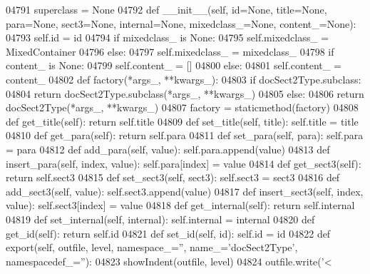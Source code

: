 \begin{DoxyCode}
{{{{{{{{{{{{{{{{{{{{{{{{{{{{{{{{{{{{{{{{{{{{{{{{{{{{{{{{{{{{{{{{{{{{{{{{{{{{{{{{{{{{{{{{{{{{{{{{{{{{{{{{{{{{{{{{{{{{{{{{{{{{{{{{{{{{{{{{{{{{{{{{{{{{{{{{{{{{{{{{{{{{{{{{{{{{{{{{{{{{{{{{{{{{{{{{{{{{{{{{{{{{{{{{{{{{{{{{{{{{{{{{{{{{{{{{{{{{{{{{{{{{{{{{{{{{{{{{{{{{{{{{{{{{{{{{{{{{{{{{{{{{{{{{{{{{{{{{{{{{{{{{{{{{{{{{{{{{{{{{{{{{04791     superclass = \textcolor{keywordtype}{None}
04792     \textcolor{keyword}{def }__init__(self, id=None, title=None, para=None, sect3=None, internal=None, mixedclass\_=None, 
      content\_=None):
04793         self.id = id
04794         \textcolor{keywordflow}{if} mixedclass\_ \textcolor{keywordflow}{is} \textcolor{keywordtype}{None}:
04795             self.mixedclass_ = MixedContainer
04796         \textcolor{keywordflow}{else}:
04797             self.mixedclass_ = mixedclass\_
04798         \textcolor{keywordflow}{if} content\_ \textcolor{keywordflow}{is} \textcolor{keywordtype}{None}:
04799             self.content_ = []
04800         \textcolor{keywordflow}{else}:
04801             self.content_ = content\_
04802     \textcolor{keyword}{def }factory(*args\_, **kwargs\_):
04803         \textcolor{keywordflow}{if} docSect2Type.subclass:
04804             \textcolor{keywordflow}{return} docSect2Type.subclass(*args\_, **kwargs\_)
04805         \textcolor{keywordflow}{else}:
04806             \textcolor{keywordflow}{return} docSect2Type(*args\_, **kwargs\_)
04807     factory = staticmethod(factory)
04808     \textcolor{keyword}{def }get_title(self): \textcolor{keywordflow}{return} self.title
04809     \textcolor{keyword}{def }set_title(self, title): self.title = title
04810     \textcolor{keyword}{def }get_para(self): \textcolor{keywordflow}{return} self.para
04811     \textcolor{keyword}{def }set_para(self, para): self.para = para
04812     \textcolor{keyword}{def }add_para(self, value): self.para.append(value)
04813     \textcolor{keyword}{def }insert_para(self, index, value): self.para[index] = value
04814     \textcolor{keyword}{def }get_sect3(self): \textcolor{keywordflow}{return} self.sect3
04815     \textcolor{keyword}{def }set_sect3(self, sect3): self.sect3 = sect3
04816     \textcolor{keyword}{def }add_sect3(self, value): self.sect3.append(value)
04817     \textcolor{keyword}{def }insert_sect3(self, index, value): self.sect3[index] = value
04818     \textcolor{keyword}{def }get_internal(self): \textcolor{keywordflow}{return} self.internal
04819     \textcolor{keyword}{def }set_internal(self, internal): self.internal = internal
04820     \textcolor{keyword}{def }get_id(self): \textcolor{keywordflow}{return} self.id
04821     \textcolor{keyword}{def }set_id(self, id): self.id = id
04822     \textcolor{keyword}{def }export(self, outfile, level, namespace\_='', name\_='docSect2Type', namespacedef\_=''):
04823         showIndent(outfile, level)
04824         outfile.write(\textcolor{stringliteral}{'<%
}}}}}}}}}}}}}}}}}}}}}}}}}}}}}}}}}}}}}}}}}}}}}}}}}}}}}}}}}}}}}}}}}}}}}}}}}}}}}}}}}}}}}}}}}}}}}}}}}}}}}}}}}}}}}}}}}}}}}}}}}}}}}}}}}}}}}}}}}}}}}}}}}}}}}}}}}}}}}}}}}}}}}}}}}}}}}}}}}}}}}}}}}}}}}}}}}}}}}}}}}}}}}}}}}}}}}}}}}}}}}}}}}}}}}}}}}}}}}}}}}}}}}}}}}}}}}}}}}}}}}}}}}}}}}}}}}}}}}}}}}}}}}}}}}}}}}}}}}}}}}}}}}}}}}}}}}}}}}}}}}}}}}
\end{DoxyCode}

